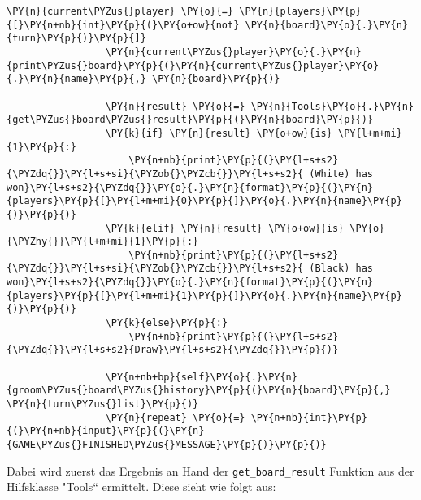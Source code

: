 \begin{Verbatim}[commandchars=\\\{\}]
                 \PY{n}{current\PYZus{}player} \PY{o}{=} \PY{n}{players}\PY{p}{[}\PY{n+nb}{int}\PY{p}{(}\PY{o+ow}{not} \PY{n}{board}\PY{o}{.}\PY{n}{turn}\PY{p}{)}\PY{p}{]}
                 \PY{n}{current\PYZus{}player}\PY{o}{.}\PY{n}{print\PYZus{}board}\PY{p}{(}\PY{n}{current\PYZus{}player}\PY{o}{.}\PY{n}{name}\PY{p}{,} \PY{n}{board}\PY{p}{)}
         
                 \PY{n}{result} \PY{o}{=} \PY{n}{Tools}\PY{o}{.}\PY{n}{get\PYZus{}board\PYZus{}result}\PY{p}{(}\PY{n}{board}\PY{p}{)}
                 \PY{k}{if} \PY{n}{result} \PY{o+ow}{is} \PY{l+m+mi}{1}\PY{p}{:}
                     \PY{n+nb}{print}\PY{p}{(}\PY{l+s+s2}{\PYZdq{}}\PY{l+s+si}{\PYZob{}\PYZcb{}}\PY{l+s+s2}{ (White) has won}\PY{l+s+s2}{\PYZdq{}}\PY{o}{.}\PY{n}{format}\PY{p}{(}\PY{n}{players}\PY{p}{[}\PY{l+m+mi}{0}\PY{p}{]}\PY{o}{.}\PY{n}{name}\PY{p}{)}\PY{p}{)}
                 \PY{k}{elif} \PY{n}{result} \PY{o+ow}{is} \PY{o}{\PYZhy{}}\PY{l+m+mi}{1}\PY{p}{:}
                     \PY{n+nb}{print}\PY{p}{(}\PY{l+s+s2}{\PYZdq{}}\PY{l+s+si}{\PYZob{}\PYZcb{}}\PY{l+s+s2}{ (Black) has won}\PY{l+s+s2}{\PYZdq{}}\PY{o}{.}\PY{n}{format}\PY{p}{(}\PY{n}{players}\PY{p}{[}\PY{l+m+mi}{1}\PY{p}{]}\PY{o}{.}\PY{n}{name}\PY{p}{)}\PY{p}{)}
                 \PY{k}{else}\PY{p}{:}
                     \PY{n+nb}{print}\PY{p}{(}\PY{l+s+s2}{\PYZdq{}}\PY{l+s+s2}{Draw}\PY{l+s+s2}{\PYZdq{}}\PY{p}{)}
         
                 \PY{n+nb+bp}{self}\PY{o}{.}\PY{n}{groom\PYZus{}board\PYZus{}history}\PY{p}{(}\PY{n}{board}\PY{p}{,} \PY{n}{turn\PYZus{}list}\PY{p}{)}
                 \PY{n}{repeat} \PY{o}{=} \PY{n+nb}{int}\PY{p}{(}\PY{n+nb}{input}\PY{p}{(}\PY{n}{GAME\PYZus{}FINISHED\PYZus{}MESSAGE}\PY{p}{)}\PY{p}{)}
\end{Verbatim}

    Dabei wird zuerst das Ergebnis an Hand der \texttt{get\_board\_result}
Funktion aus der Hilfsklasse "Tools`` ermittelt. Diese sieht wie folgt
aus:

